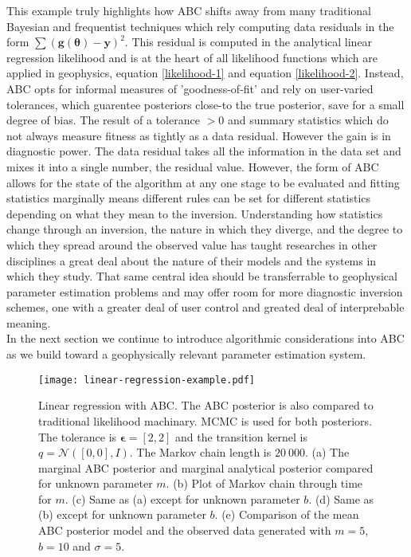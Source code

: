 This example truly highlights how ABC shifts away from many traditional Bayesian and frequentist techniques which rely computing data residuals in the form $\sum (\bm{g}(\bm{\theta})-\bm{y})^2$. This residual is computed in the analytical linear regression likelihood and is at the heart of all likelihood functions which are applied in geophysics, equation \ref{likelihood-1} and equation \ref{likelihood-2}. Instead, ABC opts for informal measures of 'goodness-of-fit' and rely on user-varied tolerances, which guarentee posteriors close-to the true posterior, save for a small degree of bias. The result of a tolerance $> 0$ and summary statistics which do not always measure fitness as tightly as a data residual. However the gain is in diagnostic power. The data residual takes all the information in the data set and mixes it into a single number, the residual value. However, the form of ABC allows for the state of the algorithm at any one stage to be evaluated and fitting statistics marginally means different rules can be set for different statistics depending on what they mean to the inversion. Understanding how statistics change through an inversion, the nature in which they diverge, and the degree to which they spread around the observed value has taught researches in other disciplines a great deal about the nature of their models and the systems in which they study. That same central idea should be transferrable to geophysical parameter estimation problems and may offer room for more diagnostic inversion schemes, one with a greater deal of user control and greated deal of interprebable meaning. \\

In the next section we continue to introduce algorithmic considerations into ABC as we build toward a geophysically relevant parameter estimation system. \\

\begin{figure}[H]
	\centering
	\texttt{[image: linear-regression-example.pdf]}
	\caption{Linear regression with ABC. The ABC posterior is also compared to traditional likelihood machinary. MCMC is used for both posteriors. The tolerance is $\bm{\epsilon} = [2,2]$ and the transition kernel is $q = \mathcal{N}([0,0],I)$. The Markov chain length is $20\ 000$. (a) The marginal ABC posterior and marginal analytical posterior compared for unknown parameter $m$. (b) Plot of Markov chain through time for $m$. (c) Same as (a) except for unknown parameter $b$. (d) Same as (b) except for unknown parameter $b$. (e) Comparison of the mean ABC posterior model and the observed data generated with $m = 5$, $b = 10$ and $\sigma = 5$.}
	\label{linear-regression}
\end{figure}

